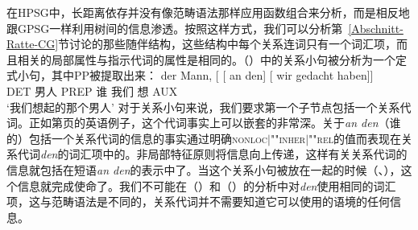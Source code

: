 在HPSG中，长距离依存并没有像范畴语法那样应用函数组合来分析，而是相反地跟GPSG一样利用树间的信息渗透。按照这样方式，我们可以分析第~\ref{Abschnitt-Ratte-CG}节讨论的那些随伴结构，这些结构中每个关系连词只有一个词汇项，而且相关的局部属性与指示代词的属性是相同的。（）中的关系小句被分析为一个定式小句，其中PP被提取出来： 
\ea
\gll der Mann, [ [ an den] [ wir gedacht haben]]\\
     DET 男人   {}        {}        PREP 谁  {}          我们 想 AUX\\
\glt `我们想起的那个男人'
\z
对于关系小句来说，我们要求第一个子节点包括一个关系代词。正如第\pageref{Beispiel-Minister}页的英语例子，这个代词事实上可以嵌套的非常深。关于\emph{an den}（谁的）包括一个关系代词的信息的事实通过明确\textsc{nonloc$|$""inher$|$""rel}的值而表现在关系代词\emph{den}的词汇项中的。非局部特征原则将信息向上传递，这样有关关系代词的信息就包括在短语\emph{an den}的表示中了。当这个关系小句被放在一起的时候（\citealp[Chapter~5]{ps2}、\citealp{Sag97a}），这个信息就完成使命了。我们不可能在（）和（）的分析中对\emph{den}使用相同的词汇项，这与范畴语法是不同的，关系代词并不需要知道它可以使用的语境的任何信息。

